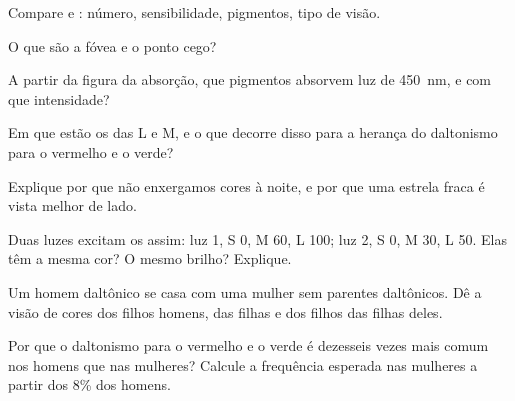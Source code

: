 \begin{exercise}[$\star$]\label{exo:g11:the-eye:2}
Compare  e : número, sensibilidade, pigmentos, tipo de visão.
\end{exercise}

\begin{exercise}[$\star$]\label{exo:g11:the-eye:3}
O que são a fóvea e o ponto cego?
\end{exercise}

\begin{exercise}[$\star$]\label{exo:g11:the-eye:4}
A partir da figura da absorção, que pigmentos absorvem luz de
\qty{450}{nm}, e com que intensidade?
\end{exercise}

\begin{exercise}[$\star$]\label{exo:g11:the-eye:5}
Em que  estão os  das  L e M, e o que decorre
disso para a herança do daltonismo para o vermelho e o verde?
\end{exercise}

\begin{exercise}[$\star\star$]\label{exo:g11:the-eye:6}
Explique por que não enxergamos cores à noite, e por que uma estrela
fraca é vista melhor de lado.
\end{exercise}

\begin{exercise}[$\star\star$]\label{exo:g11:the-eye:7}
Duas luzes excitam os  assim: luz 1, S 0, M 60, L 100; luz 2, S 0,
M 30, L 50. Elas têm a mesma cor? O mesmo brilho? Explique.
\end{exercise}

\begin{exercise}[$\star\star$]\label{exo:g11:the-eye:8}
Um homem daltônico se casa com uma mulher sem parentes daltônicos. Dê a
visão de cores dos filhos homens, das filhas e dos filhos das filhas
deles.
\end{exercise}

\begin{exercise}[$\star\star$]\label{exo:g11:the-eye:9}
Por que o daltonismo para o vermelho e o verde é dezesseis vezes mais
comum nos homens que nas mulheres? Calcule a frequência esperada nas
mulheres a partir dos 8\% dos homens.
\end{exercise}

